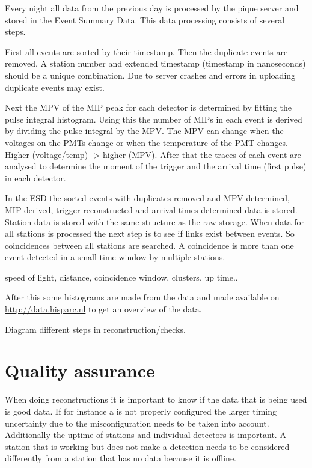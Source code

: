 Every night all data from the previous day is processed by the pique
server and stored in the Event Summary Data. This data processing
consists of several steps.

First all events are sorted by their timestamp. Then the duplicate
events are removed. A station number and extended timestamp (timestamp
in nanoseconds) should be a unique combination. Due to server crashes
and errors in uploading duplicate events may exist.

Next the MPV of the MIP peak for each detector is determined by fitting
the pulse integral histogram. Using this the number of MIPs in each
event is derived by dividing the pulse integral by the MPV. The MPV can
change when the voltages on the PMTs change or when the temperature of
the PMT changes. Higher (voltage/temp) -> higher (MPV). After that the
traces of each event are analysed to determine the moment of the trigger
and the arrival time (first pulse) in each detector.

In the ESD the sorted events with duplicates removed and MPV determined,
MIP derived, trigger reconstructed and arrival times determined data is
stored. Station data is stored with the same structure as the raw
storage. When data for all stations is processed the next step is to see
if links exist between events. So coincidences between all stations are
searched. A coincidence is more than one event detected in a small time
window by multiple stations.

speed of light, distance, coincidence window, clusters, up time..

After this some histograms are made from the data and made available on
\url{http://data.hisparc.nl} to get an overview of the data.

Diagram different steps in reconstruction/checks.


\section{Quality assurance}

When doing reconstructions it is important to know if the data that is
being used is good data. If for instance a \gps is not properly
configured the larger timing uncertainty due to the misconfiguration
needs to be taken into account. Additionally the uptime of stations and
individual detectors is important. A station that is working but does
not make a detection needs to be considered differently from a station
that has no data because it is offline.

